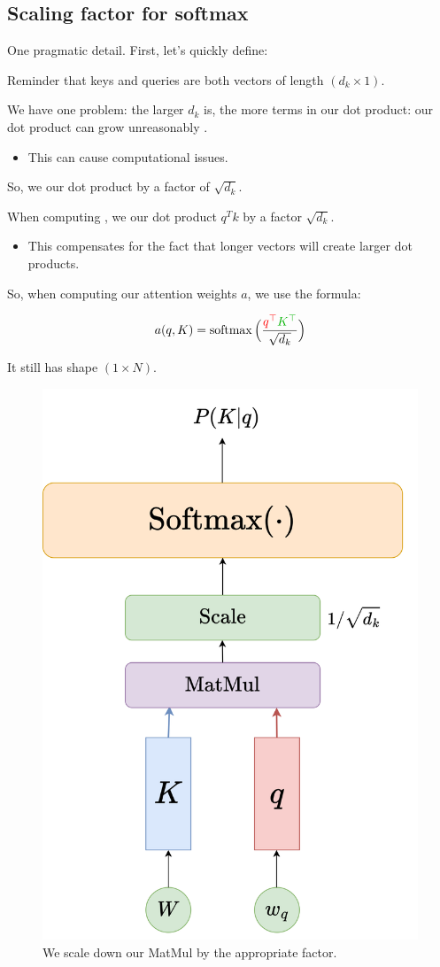     \phantom{}

    \subsection{Scaling factor for softmax}

        One pragmatic detail. First, let's quickly define:\\

        \begin{notation}
            Reminder that keys and queries are both vectors of length $(d_k \times 1)$.
        \end{notation}

        We have one problem: the larger $d_k$ is, the more terms in our dot product: our dot product can grow unreasonably .

        \begin{itemize}
            \item This can cause computational issues.
        \end{itemize}

        So, we  our dot product by a factor of $\sqrt{d_k}$.\\

        \begin{kequation}
            When computing , we  our dot product $q^Tk$ by a factor $\sqrt{d_k}$.

            \begin{itemize}
                \item This compensates for the fact that longer vectors will create larger dot products.
            \end{itemize}

            So, when computing our attention weights $a$, we use the formula:

            $$a(q,K)=\operatorname{softmax} \Big( \frac{ \red{q^\top}\grn{K^\top} }{\sqrt{d_k}} \Big)$$

            It still has shape $(1 \times N)$.
        \end{kequation}

        \begin{figure}[H]
            \centering
            \includegraphics[width=0.3\linewidth]{images/transformers_images/condensed_attention_weights_scaled.png}
            \caption*{We scale down our MatMul by the appropriate factor.}
        \end{figure}

